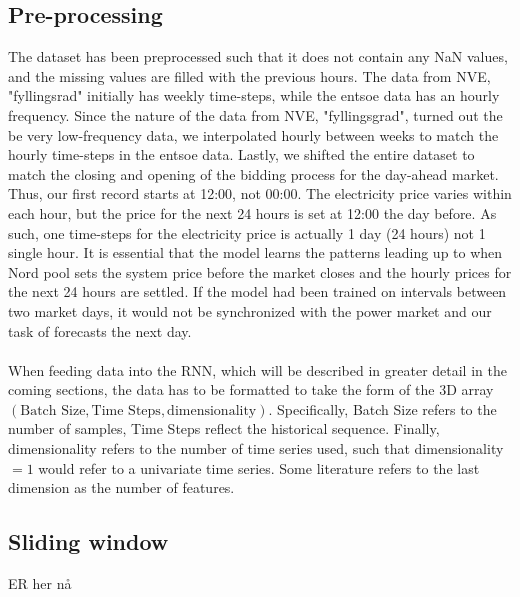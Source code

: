 \documentclass
[twocolumn,
secnumarabic,
nobibnotes,
aps,
prl,
reprint,
groupedaddress,
amsmath,
amssymb,
]{revtex4-2}
\begin{document}
\subsection{Pre-processing}
The dataset has been preprocessed such that it does not contain any NaN values, and the missing values are filled with the previous hours. The data from NVE, "fyllingsrad" initially has weekly time-steps, while the entsoe data has an hourly frequency. Since the nature of the data from NVE, "fyllingsgrad", turned out the be very low-frequency data, we interpolated hourly between weeks to match the hourly time-steps in the entsoe data. Lastly, we shifted the entire dataset to match the closing and opening of the bidding process for the day-ahead market. Thus, our first record starts at 12:00, not 00:00. The electricity price varies within each hour, but the price for the next 24 hours is set at 12:00 the day before. As such, one time-steps for the electricity price is actually 1 day (24 hours) not 1 single hour. It is essential that the model learns the patterns leading up to when Nord pool sets the system price before the market closes and the hourly prices for the next 24 hours are settled. If the model had been trained on intervals between two market days, it would not be synchronized with the power market and our task of forecasts the next day.   
\\\\
When feeding data into the RNN, which will be described in greater detail in the coming sections, the data has to be formatted to take the form of the 3D array $\left(\text{Batch Size}, \text{Time Steps}, \text{dimensionality}\right)$. Specifically, Batch Size refers to the number of samples, Time Steps reflect the historical sequence. Finally, dimensionality refers to the number of time series used, such that dimensionality $= 1$ would refer to a univariate time series. Some literature refers to the last dimension as the number of features. 


\subsection{Sliding window}
ER her nå
\end{document}

